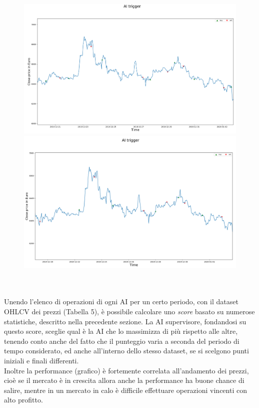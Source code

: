 \documentclass[a4paper,12pt]{report}
\begin{document}
\begin{fig}
	\\
	\begin{subfigure}{\linewidth}
		\includegraphics[width=\linewidth]{ai_trigger}
		\includegraphics[width=\linewidth]{ai_trigger2}
	\end{subfigure}
	\label{Figura 14}
\\~\\
Unendo l'elenco di operazioni di ogni AI per un certo periodo, con il dataset OHLCV dei prezzi (Tabella 5), è possibile calcolare uno \textit{score} basato su numerose statistiche, descritto nella precedente sezione. La AI supervisore, fondandosi su questo score, sceglie qual è la AI che lo massimizza di più rispetto alle altre, tenendo conto anche del fatto che il punteggio varia a seconda del periodo di tempo considerato, ed anche all'interno dello stesso dataset, se si scelgono punti iniziali e finali differenti.\\Inoltre la performance (grafico) è fortemente correlata all'andamento dei prezzi, cioè se il mercato è in crescita allora anche la performance ha buone chance di salire, mentre in un mercato in calo è difficile effettuare operazioni vincenti con alto profitto.\\

\end{fig}
\end{document}
